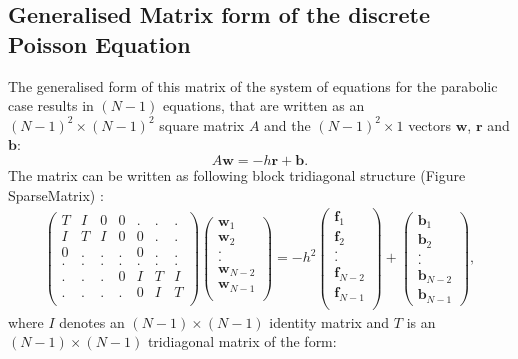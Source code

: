 \subsection{Generalised Matrix form of the discrete Poisson Equation}
The generalised form of this matrix of the system of equations for the parabolic case results in $(N-1)$ equations, that are written as an $(N-1)^2\times (N-1)^2$ square matrix $A$ and the  $(N-1)^2\times 1$ vectors $\mathbf{w}$, $\mathbf{r}$ and $\mathbf{b}$:
\[ A\mathbf{w}=-h\mathbf{r}+\mathbf{b}.\]
The matrix can be written as following block tridiagonal structure (Figure {SparseMatrix}) :
\begin{eqnarray*}
\left(\begin{array}{ccccccc}
T&I&0&0&.&.&.\\
I&T&I&0&0&.&.\\
0&.&.&.&0&.&.\\
.&.&.&.&.&.&.\\
.&.&.&0&I&T&I\\
.&.&.&.&0&I&T\\
\end{array}\right)
\left(\begin{array}{c}
\mathbf{w}_1\\
\mathbf{w}_2\\
.\\
.\\
\mathbf{w}_{N-2}\\
\mathbf{w}_{N-1}\\
\end{array}\right)
=-h^2
\left(\begin{array}{c}
\mathbf{f}_1\\
\mathbf{f}_2\\
.\\
.\\
\mathbf{f}_{N-2}\\
\mathbf{f}_{N-1}\\
\end{array}\right)
+\left(\begin{array}{c}
\mathbf{b}_1\\
\mathbf{b}_2\\
.\\
.\\
\mathbf{b}_{N-2}\\
\mathbf{b}_{N-1}
\end{array}\right),
\end{eqnarray*}
where $I$ denotes an $(N-1) \times (N-1)$ identity matrix and $T$ is an $(N-1) \times (N-1)$ tridiagonal matrix of the form:
